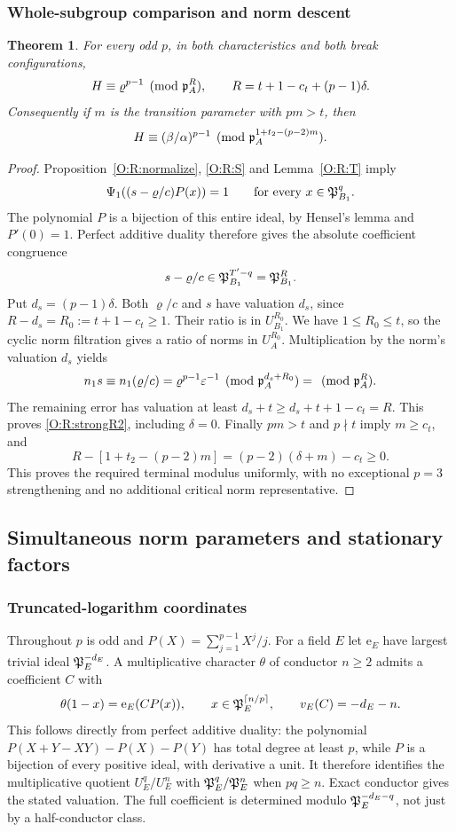 \documentclass[11pt]{amsart}
\newtheorem{theorem}{Theorem}[section]
\theoremstyle{definition}
\theoremstyle{remark}
\newcommand{\ceil}[1]{\left\lceil #1\right\rceil}
\newcommand{\ee}{\mathrm e}\newcommand{\echar}{\mathrm e}\newcommand{\FF}{\mathbf F}
\begin{document}
\subsubsection*{Whole-subgroup comparison and norm descent}
\begin{theorem}\label{O:R:R2}
For every odd $p$, in both characteristics and both break configurations,
\begin{equation}\label{O:R:strongR2}
 H\equiv \varrho^{p-1}\pmod{\mathfrak p_A^R},\qquad
 R=t+1-c_t+(p-1)\delta.
\end{equation}
Consequently if $m$ is the transition parameter with $pm>t$, then
\[
 H\equiv(\beta/\alpha)^{p-1}
       \pmod{\mathfrak p_A^{1+t_2-(p-2)m}}.
\]
\end{theorem}
\begin{proof}
Proposition~\ref{O:R:normalize}, \eqref{O:R:S} and Lemma~\ref{O:R:T} imply
\[
 \Psi_1((s-\varrho/c)P(x))=1\qquad\text{for every }x\in\mathfrak P_{B_1}^q.
\]
The polynomial $P$ is a bijection of this entire ideal, by Hensel's lemma
and $P'(0)=1$. Perfect additive duality therefore gives the absolute
coefficient congruence
\[
 s-\varrho/c\in\mathfrak P_{B_1}^{T'-q}=\mathfrak P_{B_1}^R.
\]
Put $d_s=(p-1)\delta$. Both $\varrho/c$ and $s$ have valuation $d_s$, since
$R-d_s=R_0:=t+1-c_t\ge1$. Their ratio is in $U_{B_1}^{R_0}$.
We have $1\le R_0\le t$, so the cyclic norm filtration gives a ratio of
norms in $U_A^{R_0}$. Multiplication by the norm's valuation $d_s$ yields
\[
 n_1s\equiv n_1(\varrho/c)=\varrho^{p-1}\varepsilon^{-1}
                  \pmod{\mathfrak p_A^{d_s+R_0}}=\pmod{\mathfrak p_A^R}.
\]
The remaining error has valuation at least
$d_s+t\ge d_s+t+1-c_t=R$. This proves \eqref{O:R:strongR2}, including $\delta=0$.
Finally $pm>t$ and $p\nmid t$ imply $m\ge c_t$, and
\[
 R-[1+t_2-(p-2)m]=(p-2)(\delta+m)-c_t\ge0.
\]
This proves the required terminal modulus uniformly, with no exceptional
$p=3$ strengthening and no additional critical norm representative.
\end{proof}


\subsection{Simultaneous norm parameters and stationary factors}\label{O:sec:parameters}
\subsubsection*{Truncated-logarithm coordinates}
Throughout $p$ is odd and $P(X)=\sum_{j=1}^{p-1}X^j/j$.
For a field $E$ let $\ee_E$ have largest trivial ideal $\mathfrak P_E^{-d_E}$.
A multiplicative character $\theta$ of conductor $n\ge2$ admits a
coefficient $C$ with
\begin{equation}\label{O:P:fullP}
 \theta(1-x)=\ee_E(CP(x)),\qquad
 x\in\PP_E^{\ceil{n/p}},\qquad v_E(C)=-d_E-n.
\end{equation}
This follows directly from perfect additive duality: the polynomial
$P(X+Y-XY)-P(X)-P(Y)$ has total degree at least $p$, while $P$ is a
bijection of every positive ideal, with derivative a unit. It therefore
identifies the multiplicative quotient $U_E^q/U_E^n$ with
$\mathfrak P_E^q/\mathfrak P_E^n$ when $pq\ge n$. Exact conductor gives the stated
valuation. The full coefficient is determined modulo
$\mathfrak P_E^{-d_E-q}$, not just by a half-conductor class.
\end{document}

